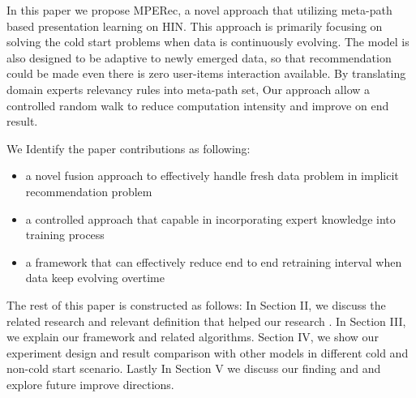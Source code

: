 In this paper we propose MPERec, a novel approach that utilizing meta-path based presentation learning on HIN. This approach is primarily focusing on solving the cold start problems when data is continuously evolving. The model is also designed to be adaptive to newly emerged data, so that recommendation could be made even there is zero user-items interaction available. By translating domain experts relevancy rules into meta-path set, Our approach allow a controlled random walk to reduce computation intensity and improve on end result. 

We Identify the paper contributions as following:
\begin{itemize}
    \item a novel fusion approach to effectively handle fresh data problem in implicit recommendation problem
    \item a controlled approach that capable in incorporating expert knowledge into training process
    \item a framework that can effectively reduce end to end retraining interval when data keep evolving overtime
\end{itemize}


The rest of this paper is constructed as follows: In Section II, we discuss the related research and relevant definition that helped our research . In Section III, we explain our framework and related algorithms. Section IV, we show our experiment design and result comparison with other models in different cold and non-cold start scenario. Lastly In Section V we discuss our finding and and explore future improve directions.